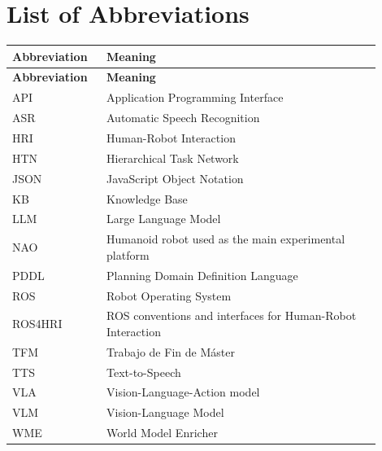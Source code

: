 \chapter*{List of Abbreviations}
\begin{longtable}{p{0.22\linewidth}p{0.68\linewidth}}
\toprule
\textbf{Abbreviation} & \textbf{Meaning}\\
\midrule
\endfirsthead
\toprule
\textbf{Abbreviation} & \textbf{Meaning}\\
\midrule
\endhead
API & Application Programming Interface\\
ASR & Automatic Speech Recognition\\
HRI & Human-Robot Interaction\\
HTN & Hierarchical Task Network\\
JSON & JavaScript Object Notation\\
KB & Knowledge Base\\
LLM & Large Language Model\\
NAO & Humanoid robot used as the main experimental platform\\
PDDL & Planning Domain Definition Language\\
ROS & Robot Operating System\\
ROS4HRI & ROS conventions and interfaces for Human-Robot Interaction\\
TFM & Trabajo de Fin de M\'aster\\
TTS & Text-to-Speech\\
VLA & Vision-Language-Action model\\
VLM & Vision-Language Model\\
WME & World Model Enricher\\
\bottomrule
\end{longtable}
